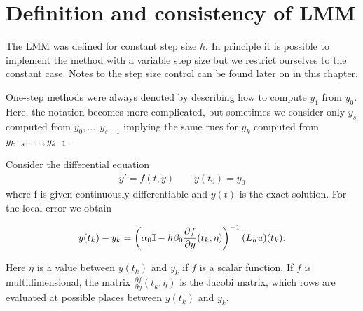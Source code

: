 \section{Definition and consistency of LMM}



\begin{remark}
   The LMM was defined for constant step size
  $h$.  In principle it is possible to implement the method with a
  variable step size but we restrict ourselves to the constant case.
  Notes to the step size control can be found later on in this chapter.
\end{remark}

\begin{remark}
  One-step methods were always denoted by describing how to compute
  $y_1$ from $y_0$. Here, the notation becomes more complicated, but
  sometimes we consider only $y_s$ computed from $y_0,\dots,y_{s-1}$
  implying the same rues for $y_k$ computed from
  $y_{k-s},\dots,y_{k-1}$.
\end{remark}


\begin{lemma}
  Consider the differential equation
  \begin{gather*}
    y' = f(t,y) \qquad y(t_0) = y_0
  \end{gather*}
  where f is given continuously differentiable and $y(t)$ is the exact solution.
  For the local error we obtain

  \begin{gather}
    y(t_k)-y_k = \left( \alpha_0 \mathbb I - h\beta_0 \frac{\partial f}{\partial y}(t_k,\eta) \right)^{-1} (L_h u)(t_k).
  \end{gather}

  Here $\eta$ is a value between $y(t_k)$ and $y_k$ if $f$ is a scalar
	function.
  If $f$ is multidimensional, the matrix 
	$\frac{\partial f}{\partial y}(t_k,\eta)$ is the Jacobi matrix, 
	which rows are evaluated at possible places between
	$y(t_k)$ and $y_k$.
\end{lemma}

